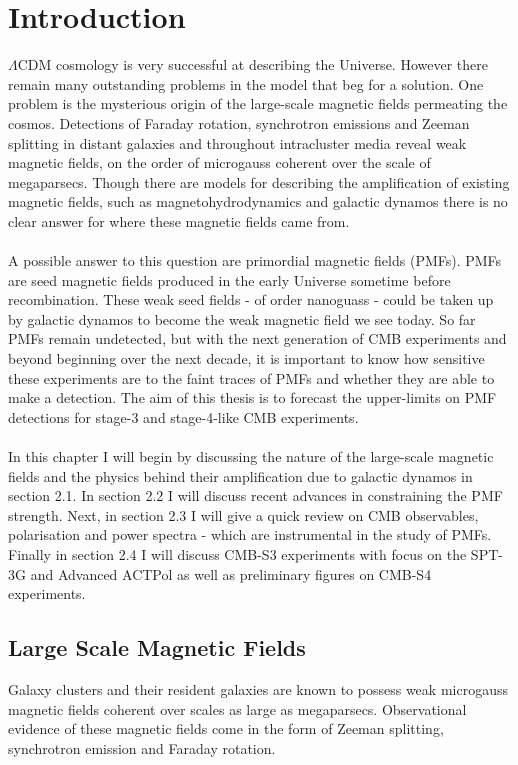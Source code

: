 \section{Introduction}

$\Lambda$CDM cosmology is very successful at describing the Universe. However there remain many outstanding problems in the model that beg for a solution. One problem is the mysterious origin of the large-scale magnetic fields permeating the cosmos. Detections of Faraday rotation, synchrotron emissions and Zeeman splitting in distant galaxies and throughout intracluster media reveal weak magnetic fields, on the order of microgauss coherent over the scale of megaparsecs. Though there are models for describing the amplification of existing magnetic fields, such as magnetohydrodynamics and galactic dynamos there is no clear answer for where these magnetic fields came from.
\\\\
A possible answer to this question are primordial magnetic fields (PMFs). PMFs are seed magnetic fields produced in the early Universe sometime before recombination. These weak seed fields - of order nanoguass - could be taken up by galactic dynamos to become the weak magnetic field we see today. So far PMFs remain undetected, but with the next generation of CMB experiments and beyond beginning over the next decade, it is important to know how sensitive these experiments are to the faint traces of PMFs and whether they are able to make a detection.
The aim of this thesis is to forecast the upper-limits on PMF detections for stage-3 and stage-4-like CMB experiments.
\\\\
In this chapter I will begin by discussing the nature of the large-scale magnetic fields and the physics behind their amplification due to galactic dynamos in section 2.1. In section 2.2 I will discuss recent advances in constraining the PMF strength. Next, in section 2.3 I will give a quick review on CMB observables, polarisation and power spectra - which are instrumental in the study of PMFs. Finally in section 2.4 I will discuss CMB-S3 experiments with focus on the SPT-3G and Advanced ACTPol as well as preliminary figures on CMB-S4 experiments.

\subsection{Large Scale Magnetic Fields}

Galaxy clusters and their resident galaxies are known to possess weak microgauss magnetic fields coherent over scales as large as megaparsecs. Observational evidence of these magnetic fields come in the form of Zeeman splitting, synchrotron emission and Faraday rotation.

